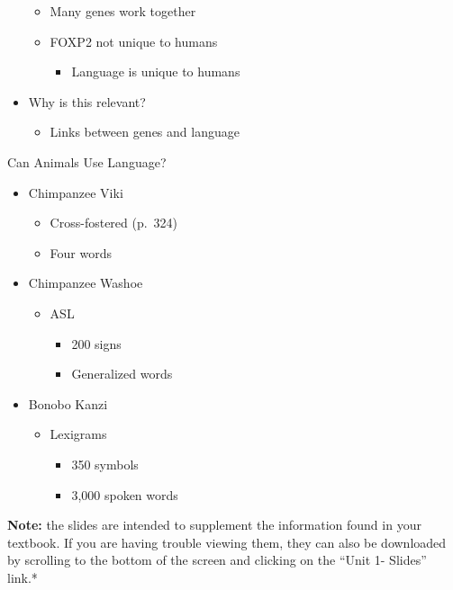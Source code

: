 \documentclass[
]{book}
\providecommand{\tightlist}{%
  \setlength{\itemsep}{0pt}\setlength{\parskip}{0pt}}
\begin{document}
\begin{reflect}
\begin{itemize}
  \begin{itemize}
  \tightlist
  \item
    Many genes work together\\
  \item
    FOXP2 not unique to humans

    \begin{itemize}
    \tightlist
    \item
      Language is unique to humans
    \end{itemize}
  \end{itemize}
\item
  Why is this relevant?

  \begin{itemize}
  \tightlist
  \item
    Links between genes and language
  \end{itemize}
\end{itemize}

Can Animals Use Language?

\begin{itemize}
\tightlist
\item
  Chimpanzee Viki

  \begin{itemize}
  \tightlist
  \item
    Cross-fostered (p.~324)\\
  \item
    Four words
  \end{itemize}
\item
  Chimpanzee Washoe

  \begin{itemize}
  \tightlist
  \item
    ASL

    \begin{itemize}
    \tightlist
    \item
      200 signs\\
    \item
      Generalized words
    \end{itemize}
  \end{itemize}
\item
  Bonobo Kanzi

  \begin{itemize}
  \tightlist
  \item
    Lexigrams

    \begin{itemize}
    \tightlist
    \item
      350 symbols\\
    \item
      3,000 spoken words
    \end{itemize}
  \end{itemize}
\end{itemize}

\textbf{Note:} the slides are intended to supplement the information found in your textbook. If you are having trouble viewing them, they can also be downloaded by scrolling to the bottom of the screen and clicking on the ``Unit 1- Slides'' link.*
\end{reflect}
\end{document}
